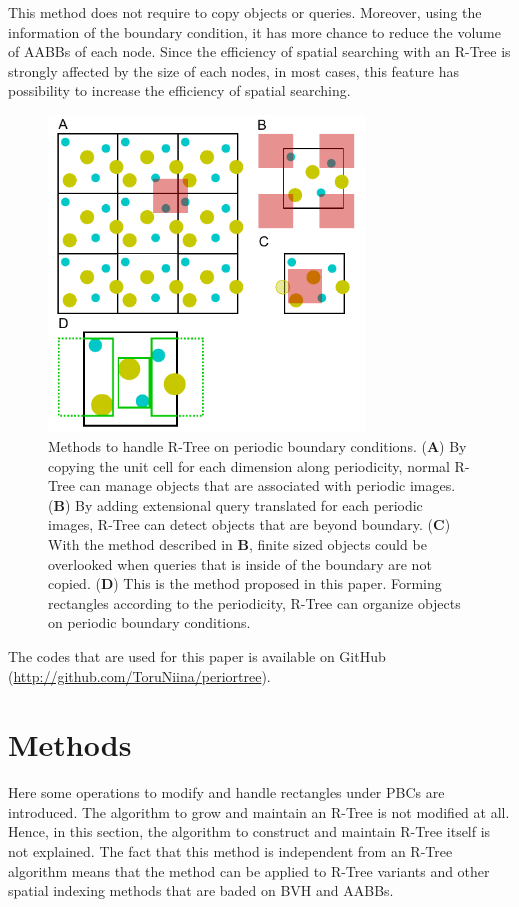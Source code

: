 \documentclass[10pt,letterpaper,twocolumn]{article}
\begin{document}
This method does not require to copy objects or queries.
Moreover, using the information of the boundary condition, it has more chance
to reduce the volume of AABBs of each node. Since the efficiency of spatial
searching with an R-Tree is strongly affected by the size of each nodes,
in most cases, this feature has possibility to increase the efficiency of
spatial searching.

\begin{figure}[hbt]
    \includegraphics[width=8.4cm, bb=6 3 220 224]{fig1.eps}
    \caption{Methods to handle R-Tree on periodic boundary conditions.
    (\textbf{A})
    By copying the unit cell for each dimension along periodicity, normal R-Tree
    can manage objects that are associated with periodic images.
    (\textbf{B})
    By adding extensional query translated for each periodic images, R-Tree can
    detect objects that are beyond boundary.
    (\textbf{C})
    With the method described in \textbf{B}, finite sized objects could be
    overlooked when queries that is inside of the boundary are not copied.
    (\textbf{D})
    This is the method proposed in this paper. Forming rectangles according to
    the periodicity, R-Tree can organize objects on periodic boundary
    conditions.}
    \label{fig-method-rtree-pbc}
\end{figure}

The codes that are used for this paper is available on GitHub
(\url{http://github.com/ToruNiina/periortree}).

\section*{Methods}

Here some operations to modify and handle rectangles under PBCs are introduced.
The algorithm to grow and maintain an R-Tree is not modified at all.
Hence, in this section, the algorithm to construct and maintain R-Tree itself is
not explained.
The fact that this method is independent from an R-Tree algorithm means that
the method can be applied to R-Tree variants and other spatial indexing
methods that are baded on BVH and AABBs.
\end{document}
